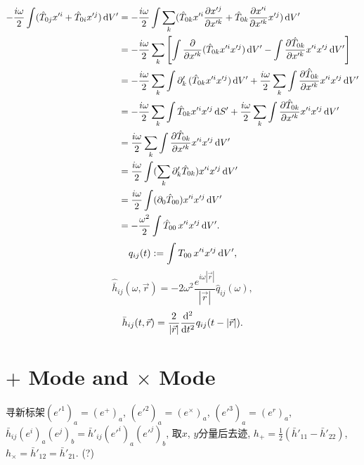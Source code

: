 \begin{align}
    -\frac{i\omega}{2}\int (\hat{T}_{0j}x'^{i}+\hat{T}_{0i}x'^{j})\,\mathrm{d} V'
    &= -\frac{i\omega}{2}\int \sum_{k}(\hat{T}_{0k}x'^{i}\frac{\partial x'^{j}}{\partial x'^{k}}+\hat{T}_{0k}\frac{\partial x'^{i}}{\partial x'^{k}}x'^{j})\,\mathrm{d} V'\\
    &= -\frac{i\omega}{2}\sum_{k}\left[\int \frac{\partial }{\partial x'^k}(\hat{T}_{0k}x'^ix'^j)\,\mathrm{d} V'-\int \frac{\partial \hat{T}_{0k}}{\partial x'^k}x'^ix'^j\,\mathrm{d} V'\right]\\
    &= -\frac{i\omega}{2}\sum_{k}\int \partial'_k\,(\hat{T}_{0k}x'^ix'^j)\,\mathrm{d} V' +\frac{i\omega}{2}\sum_{k}\int \frac{\partial \hat{T}_{0k}}{\partial x'^k}x'^ix'^j\,\mathrm{d} V'\\
    &= -\frac{i\omega}{2}\sum_{k}\int \hat{T}_{0k}x'^ix'^j\,\mathrm{d} S' +\frac{i\omega}{2}\sum_{k}\int \frac{\partial \hat{T}_{0k}}{\partial x'^k}x'^ix'^j\,\mathrm{d} V'\\
    &= \frac{i\omega}{2}\sum_{k}\int \frac{\partial \hat{T}_{0k}}{\partial x'^k}x'^ix'^j\,\mathrm{d} V'\\
    &= \frac{i\omega}{2}\int (\sum_{k}\partial'_k\hat{T}_{0k})x'^ix'^j\,\mathrm{d} V'\\
    &= \frac{i\omega}{2}\int (\partial_0\hat{T}_{00})x'^ix'^j\,\mathrm{d} V'\\
    &= -\frac{\omega^2}{2}\int \hat{T}_{00}\,x'^ix'^j\,\mathrm{d} V'.
\end{align}
\begin{equation}
    q_{ij}(t):=\int{T}_{00}\,x'^ix'^j\,\mathrm{d} V',
\end{equation}
\begin{equation}
    \hat{\bar{h}}_{ij}(\omega,\vec{r}) = -2\omega^2\frac{e^{i\omega\left\lvert\vec{r}\right\rvert}}{\left\lvert\vec{r}\right\rvert}\hat{q}_{ij}(\omega),
\end{equation}
\begin{equation}
    {\bar{h}}_{ij}(t,\vec{r}) = \frac{2}{\left\lvert\vec{r}\right\rvert}
    \frac{\mathrm{d}^2}{\mathrm{d} t^2}{q}_{ij}(t-\left\lvert\vec{r}\right\rvert).\label{qf}
\end{equation}

\section{$+$ Mode and $\times$ Mode}

寻新标架$(e'^1)_a=(e^+)_a$, $(e'^2)_a=(e^\times)_a$, $(e'^3)_a=(e^r)_a$, ${\bar{h}}_{ij}(e^i)_a(e^j)_b={\bar{h}}'_{ij}(e'^i)_a(e'^j)_b$, 取$x$, $y$分量后去迹, $h_+=\frac{1}{2}({\bar{h}}'_{11}-{\bar{h}}'_{22})$, $h_\times={\bar{h}}'_{12}={\bar{h}}'_{21}$. (?) \cite{Sathyaprakash2009}

